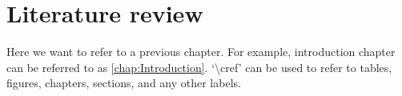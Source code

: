 \section{Literature review} \label{chap:lit_review}

Here we want to refer to a previous chapter. For example, introduction chapter can be referred to as \cref{chap:Introduction}. `\textbackslash cref' can be used to refer to tables, figures, chapters, sections, and any other labels.